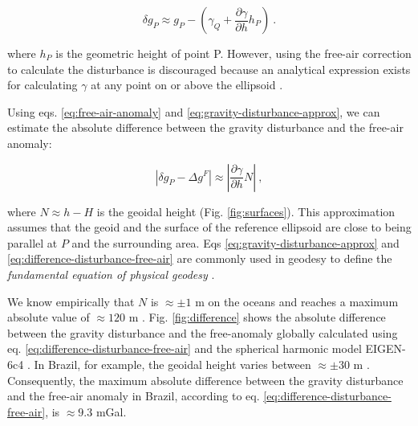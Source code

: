 \documentclass[extra]{gji}
\begin{document}
\begin{equation}
\delta g_{P} \approx g_{P} -
\left( \gamma_{Q} + \frac{\partial \gamma}{\partial h} h_P \right) \: .
\label{eq:gravity-disturbance-approx}
\end{equation}

\noindent
where $h_P$ is the geometric height of point P.
However, using the free-air correction to calculate the disturbance is
discouraged because an analytical expression exists for calculating $\gamma$ at
any point on or above the ellipsoid \citep{li2001}.

Using eqs. \ref{eq:free-air-anomaly} and \ref{eq:gravity-disturbance-approx},
we can estimate the absolute difference between the gravity disturbance and the
free-air anomaly:

\begin{equation}
\left\vert \delta g_{P} - \Delta g^{F} \right\vert \approx
\left\vert \frac{\partial \gamma}{\partial h} N \right\vert \: ,
\label{eq:difference-disturbance-free-air}
\end{equation}

\noindent
where $N \approx h - H$ is the geoidal height (Fig. \ref{fig:surfaces}).
This approximation assumes that the geoid and the surface of
the reference ellipsoid are close to being parallel at $P$
and the surrounding area.
Eqs \ref{eq:gravity-disturbance-approx}
and \ref{eq:difference-disturbance-free-air} are commonly used
in geodesy to define the \textit{fundamental equation of physical
geodesy} \citep{hofmann-wellenhof-moritz2005}.

We know empirically that $N$ is $\approx \pm 1$ m on the oceans
and reaches a maximum absolute value of $\approx 120$ m
\citep[e.g.,][]{torge2012, sanso_sideris2013}.
Fig. \ref{fig:difference} shows the absolute difference between the
gravity disturbance and the free-anomaly globally calculated
using eq. \ref{eq:difference-disturbance-free-air} and the spherical harmonic
model EIGEN-6c4 \citep{forste2014}.
In Brazil, for example, the geoidal height
varies between $\approx \pm 30$ m \citep{ibge_mapgeo2015}.
Consequently,
the maximum absolute difference between the gravity disturbance and
the free-air anomaly in Brazil,
according to eq. \ref{eq:difference-disturbance-free-air},
is $\approx 9.3$ mGal.
\end{document}
